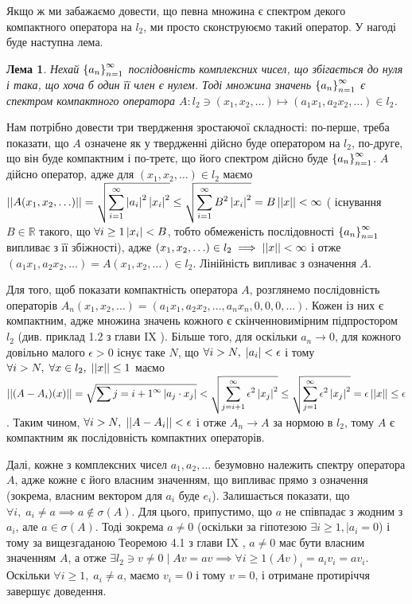 \documentclass[12pt]{article} %
\newtheorem{myulem}[mythm]{Лема}
\renewenvironment{myproof}[1][Доведення]{\begin{trivlist}
\item[\hskip \labelsep {\bfseries #1}]}{\myqed\end{trivlist}}
\begin{document}
	Якщо ж ми забажаємо довести, що певна множина є спектром декого компактного оператора на $l_2$, ми просто сконструюємо такий оператор. У 
	нагоді буде наступна лема.
	\begin{myulem}\label{CompactSpectrumLemma}
		Нехай $\left\{a_n\right\}_{n=1}^{\infty}$ послідовність комплексних чисел, що збігається до нуля і така, що хоча б один її член
		є нулем.
		Тоді множина значень $\left\{a_n\right\}_{n=1}^{\infty}$ є спектром компактного оператора
	$A:l_2\ni(x_1,x_2,\hdots)\mapsto(a_1x_1,a_2x_2,\hdots)\in l_2$.\end{myulem}
	\begin{myproof} Нам потрібно довести три твердження зростаючої складності: по-перше, треба показати, що $A$ означене як у твердженні
		дійсно буде оператором на $l_2$, 
		по-друге, що він буде компактним
		і по-третє, що його спектром дійсно буде $\left\{a_n\right\}_{n=1}^{\infty}$.
		$A$ дійсно оператор, адже для $(x_1,x_2,\hdots)\in l_2$ маємо $\mynorm{A(x_1,x_2,\hdots)}=\sqrt{\sum_{i=1}^{\infty}
		\myabs{a_i}^2\myabs{x_i}^2}\leq\sqrt{\sum_{i=1}^{\infty}B^2\myabs{x_i}^2}=B\mynorm{x}<\infty$ (
		існування $B\in\mathbb{R}$ такого, що $\forall i\geq 1 \left|x_i\right|<B$, тобто обмеженість послідовності
		$\left\{a_n\right\}_{n=1}^{\infty}$ випливає з її збіжності), адже $(x_1,x_2,\hdots)\in l_2\implies
		\left|\left|x\right|\right|<\infty$ і отже $(a_1x_1,a_2x_2,\hdots)=A(x_1,x_2,\hdots)\in l_2$. Лінійність випливає з означення $A$.
		
		Для того, щоб показати компактність оператора $A$, розглянемо послідовність операторів $A_n(x_1,x_2,\dots)=(a_1x_1,a_2x_2,\dots,
		a_nx_n,0,0,0,\dots)$. Кожен із них є компактним, адже множина значень кожного є скінченновимірним підпростором $l_2$ (див. приклад
		1.2 з глави IX \cite{tb}). Більше того, для оскільки $a_n\to0$, для кожного довільно малого $\epsilon>0$ існує таке $N$,
		що $\forall i>N,\;\left|a_i\right|<\epsilon$ і тому $\forall i>N,\;\forall x\in l_2,\;\left|\left|x\right|\right|\leq1$ маємо $\mynorm{(A-A_i)(x)}=
		\sqrt{\sum{j=i+1}^{\infty}\myabs{a_j\cdot x_j}}<\sqrt{\sum_{j=i+1}^{\infty}\epsilon^2\myabs{x_j}^2}\leq
		\sqrt{\sum_{j=1}^{\infty}\epsilon^2\myabs{x_j}^2}=\epsilon\mynorm{x}\leq\epsilon$. Таким чином, $\forall i>N,\;\left|\left|A-A_i\right|\right|<
		\epsilon$ і отже $A_n\to A$ за нормою в $l_2$, тому $A$ є компактним як послідовність компактних операторів.

		Далі, кожне з комплексних чисел $a_1,a_2,\hdots$ безумовно належить спектру оператора $A$, адже кожне є його власним значенням,
		що випливає прямо з означення (зокрема, власним вектором для $a_i$ буде $e_i$). Залишається показати, що $\forall i,\;a_i\neq a\implies a\notin\sigma(A)$.
		Для цього, припустимо, що $a$ не співпадає з жодним з $a_i$, але $a\in\sigma(A)$.
		Тоді зокрема $a\neq 0$ (оскільки за гіпотезою $\exists i\geq 1,\mid a_i=0$) і тому за вищезгаданою Теоремою 4.1 з
		глави IX \cite{tb}, $a\neq0$ має бути власним значенням $A$, а отже $\exists l_2\ni v\neq0\mid Av=av\implies\forall i\geq 1
		(Av)_i=a_iv_i=av_i$. Оскільки $\forall i\geq 1,\;a_i\neq a$, маємо $v_i=0$ і тому $v=0$, і отримане протиріччя завершує доведення.
	\end{myproof}
\end{document}
